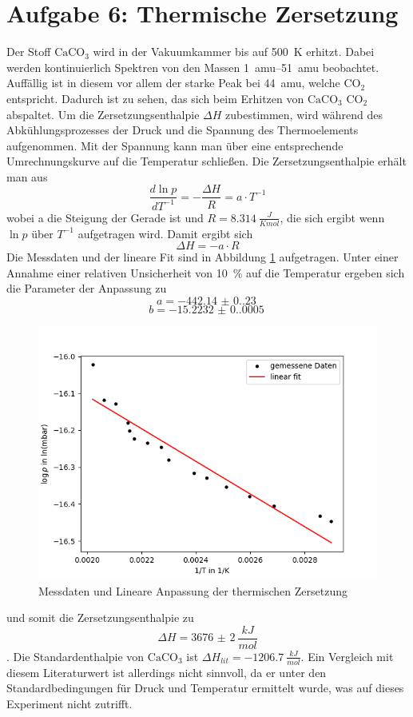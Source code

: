 \section{Aufgabe 6: Thermische Zersetzung}
Der Stoff $\text{CaCO}_3$ wird in der Vakuumkammer bis auf \SI{500}{K} erhitzt. Dabei werden kontinuierlich Spektren von den Massen \SIrange[]{1}{51}{amu} beobachtet. Auffällig ist in diesem vor allem der starke Peak bei \SI{44}{amu}, welche $\text{CO}_2$ entspricht. Dadurch ist zu sehen, das sich beim Erhitzen von $\text{CaCO}_3$ $\text{CO}_2$ abspaltet. Um die Zersetzungsenthalpie $\Delta H$ zubestimmen, wird während des Abkühlungsprozesses der Druck und die Spannung des Thermoelements aufgenommen. Mit der Spannung kann man über eine entsprechende Umrechnungskurve\cite{VorbereitungsMappe} auf die Temperatur schließen. 
Die Zersetzungsenthalpie erhält man aus $$\frac{d \ln{p}}{d T^{-1}} = -\frac{\Delta H}{R} = a\cdot T^{-1}$$ wobei a die Steigung der Gerade ist und $R = \SI{8.314}{\frac{J}{K mol}}$, die sich ergibt wenn $\ln{p}$ über $T^{-1}$ aufgetragen wird. Damit ergibt sich 
$$\Delta H = -a\cdot R$$
Die Messdaten und der lineare Fit sind in Abbildung \ref{fig:MSTherm} aufgetragen. 
Unter einer Annahme einer relativen Unsicherheit von \SI{10}{\%} auf die  Temperatur ergeben sich die Parameter der Anpassung zu
$$a = \SI{-442.14(0.23)}{}$$
$$b = \SI{-15.2232(0.0005)}{}$$

\begin{figure}[H]
    \centering
    \includegraphics[width=120mm,scale=0.8]{Massenspektrometer/include/MSTherm.png}
    \caption{Messdaten und Lineare Anpassung der thermischen Zersetzung}
    \label{fig:MSTherm}
\end{figure}
und somit die Zersetzungsenthalpie zu 
$$\Delta H = \SI{3676(2)}{\frac{kJ}{mol}}$$. 
Die Standardenthalpie von $\text{CaCO}_3$ ist $\Delta H_{lit} = \SI{-1206.7}{\frac{kJ}{mol}}$\cite{Standardenthalpe}. Ein Vergleich mit diesem Literaturwert ist allerdings nicht sinnvoll, da er unter den Standardbedingungen für Druck und Temperatur ermittelt wurde, was auf dieses Experiment nicht zutrifft. 